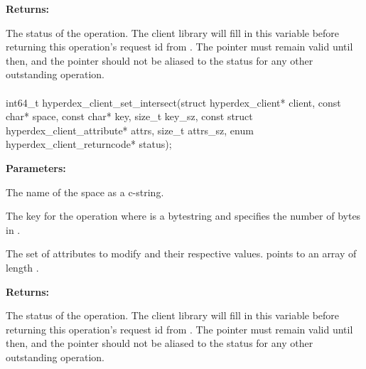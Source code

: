 \noindent\textbf{Returns:}
\begin{description}[labelindent=\widthof{{\code{status}}},leftmargin=*,noitemsep,nolistsep,align=right]
\item[\code{status}] The status of the operation.  The client library will fill in this variable before returning this operation's request id from .  The pointer must remain valid until then, and the pointer should not be aliased to the status for any other outstanding operation.
\end{description}

\paragraph{}
\label{api:c:set_intersect}
\begin{ccode}
int64_t hyperdex_client_set_intersect(struct hyperdex_client* client,
                const char* space,
                const char* key, size_t key_sz,
                const struct hyperdex_client_attribute* attrs, size_t attrs_sz,
                enum hyperdex_client_returncode* status);
\end{ccode}
\funcdesc 

\noindent\textbf{Parameters:}
\begin{description}[labelindent=\widthof{{\code{attrs}, \code{attrs\_sz}}},leftmargin=*,noitemsep,nolistsep,align=right]
\item[\code{space}] The name of the space as a c-string.
\item[\code{key}, \code{key\_sz}] The key for the operation where  is a bytestring and  specifies the number of bytes in .
\item[\code{attrs}, \code{attrs\_sz}] The set of attributes to modify and their respective values.   points to an array of length .
\end{description}

\noindent\textbf{Returns:}
\begin{description}[labelindent=\widthof{{\code{status}}},leftmargin=*,noitemsep,nolistsep,align=right]
\item[\code{status}] The status of the operation.  The client library will fill in this variable before returning this operation's request id from .  The pointer must remain valid until then, and the pointer should not be aliased to the status for any other outstanding operation.
\end{description}

